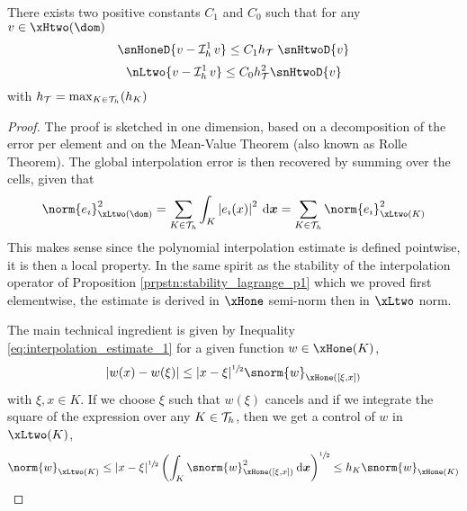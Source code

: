 \begin{prpstn}
\label{prpstn:interpolation_p1}
There exists two positive constants $C_1$ and $C_0$ such that for any $v\in\xHtwo(\dom)$
\begin{equation}
\snHoneD{v - \Lgrh{1}v}  \leq C_1 \sizeT\;\snHtwoD{v}
\end{equation}
\begin{equation}
\nLtwo{v - \Lgrh{1}v}  \leq C_0 \sizeT^2 \snHtwoD{v}
\end{equation}
with $h_{\mathcal T} = \max_{K\in{\mathcal T}_h}(h_K)$
\end{prpstn}
\begin{proof}
The proof is sketched in one dimension, based on a decomposition of the error per element and on the Mean-Value Theorem (also known as Rolle Theorem).
The global interpolation error is then recovered by summing over the cells, given that
\begin{equation*}
\norm{e_\imath}^2_{\xLtwo(\dom)} = \sum_{K\in\meshT} \int_K\Abs{e_\imath(x)}^2 \dxx = \sum_{K\in\meshT} \norm{e_\imath}^2_{\xLtwo(K)}
\end{equation*}
This makes sense since the polynomial interpolation estimate is defined pointwise, it is then a local property.
In the same spirit as the stability of the interpolation operator of Proposition \ref{prpstn:stability_lagrange_p1} which we proved first elementwise, the estimate is derived in $\xHone$ semi-norm then in $\xLtwo$ norm.

\medskip
The main technical ingredient is given by Inequality \eqref{eq:interpolation_estimate_1} for a given function $w\in\xHone(K)$,
\begin{equation}\label{eq:interpolation_estimate_trick_1}
\Abs{w(x) - w(\xi)} \leq \displaystyle|x - \xi|^{\sfrac{1}{2}}\snorm{w}_{\xHone([\xi, x])}
\end{equation}
with $\xi, x\in K$.
If we choose $\xi$ such that $w(\xi)$ cancels and if we integrate the square of the expression over any $K\in{\mathcal T}_h$, then we get a control of $w$ in $\xLtwo(K)$,
\begin{equation}\label{eq:interpolation_estimate_trick_2}
\norm{w}_{\xLtwo(K)} \leq \displaystyle|x - \xi|^{\sfrac{1}{2}}\left(\int_K \snorm{w}^2_{\xHone([\xi, x])}\dxx\right)^{\sfrac{1}{2}} \leq h_K\snorm{w}_{\xHone(K)}
\end{equation}


\end{proof}
